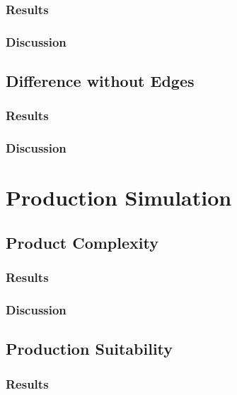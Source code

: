 \subsubsection{Results}

\subsubsection{Discussion}

\subsection{Difference without Edges}

\subsubsection{Results}

\subsubsection{Discussion}

\section{Production Simulation}
\label{ch:evaluation:se:productionSimulation}

\subsection{Product Complexity}

\subsubsection{Results}

\subsubsection{Discussion}

\subsection{Production Suitability}

\subsubsection{Results}


